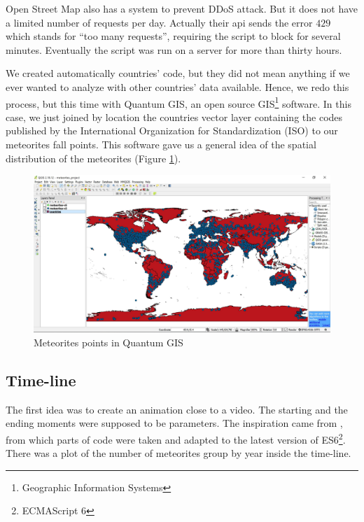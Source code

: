 \documentclass[10pt,conference,compsocconf]{IEEEtran}
\begin{document}
Open Street Map also has a system to prevent DDoS attack. But it does not have a limited number of requests per day. Actually their api sends the error $429$ which stands for ``too many requests'', requiring the script to block for several minutes. Eventually the script was run on a server for more than thirty hours.

We created automatically countries' code, but they did not mean anything if we ever wanted to analyze with other countries' data available. Hence, we redo this process, but this time with Quantum GIS, an open source GIS\footnote{Geographic Information Systems} software. In this case, we just joined by location the countries vector layer containing the codes published by the International Organization for Standardization (ISO) to our meteorites fall points. This software gave us a general idea of the spatial distribution of the meteorites (Figure \ref{fig:met_qgis}). 

\begin{figure}[H]
  \centering
  \includegraphics[width=\columnwidth]{images/meteorites_qgis}
  \vspace{-3mm}
  \caption{Meteorites points in Quantum GIS}
  \label{fig:met_qgis}
\end{figure}
 

\subsection{Time-line}

The first idea was to create an animation close to a video. The starting and the ending moments were supposed to be parameters. The inspiration came from \cite{ocks_brush_and_zoom}, from which parts of code were taken and adapted to the latest version of ES6\footnote{ECMAScript 6}. There was a plot of the number of meteorites group by year inside the time-line.
\end{document}
